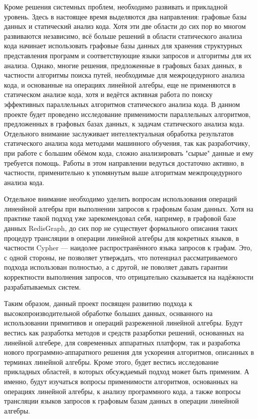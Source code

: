\documentclass[12pt]{article}  %
\theoremstyle{remark}
\begin{document}
Кроме решения системных проблем, необходимо развивать и прикладной уровень. Здесь в настоящее время выделяются два направления: графовые базы данных и статический анализ кода. Хотя эти две области до сих пор во многом развиваются независимо, всё больше решений в области статического анализа кода начинает использовать графовые базы данных для хранения структурных представления программ и соответствующие языки запросов и алгоритмы для их анализа. Однако, многие решения, предложенные в графовых базах данных, в частности алгоритмы поиска путей, необходимые для межроцедурного анализа кода, и основанные на операциях линейной алгебры, еще не применяются в статическом анализе кода, хотя и ведётся активная работа по поиску эффективных параллельных алгоритмов статического анализа кода. В данном проекте будет проведено исследование применимости параллельных алгоритмов, предложенных в графовых базах данных, к задачам статического анализа кода. Отдельного внимание заслуживает интеллектуальная обработка результатов статического анализа кода методами машинного обучения, так как разработчику, при работе с большим обёмом кода, сложно анализировать "сырые" данные и ему требуется помощь. Работы в этом направлении ведуться достаточно активно, в частности, применительно к упомянутым выше алгоритмам межпроцедурного анализа кода. 

Отдельное внимание необходимо уделить вопросам использования операций линенйной алгебры при выполнении запросов к графовым базам данных. Хотя на практике такой подход уже зарекомендовал себя, например, в графовой базе данных RedisGraph, до сих пор не существует формального описания таких процедур трансляции в операции линейной алгебры для кокретных языков, в частности Cypher --- наидолее распространённого языка запросов к графам. Это, с одной стороны, не позволяет утверждать, что потенциал рассматриваемого подхода использован полностью, а с другой, не поволяет давать гарантии корректности выполнения запросов, что отрицательно сказывается на надёжности разрабатываемых систем.

Таким образом, данный проект посвящен развитию подхода к высокопроизводительной обработке больших данных, оснванного на использовании примитивов и операций разреженной линейной алгебры. Будут вестись как разработка методов и средств разарботки решений, основанных на линейной алгебере, для современных аппаратных платформ, так и разработка нового программно-аппаратного решения для ускореиня алгоритмов, описанных в терминах линейной алгебры. Кроме этого, будет вестись исследование прикладных областей, в которых обсуждаемый подход может быть применим. А именно, будут изучаться вопросы применимости алгоритмов, основанных на операциях линейной алгебры, к анализу программного кода, а также вопросы трансляции языков запросов к графовым базам данных в операции линейной алгебры.
\end{document}
